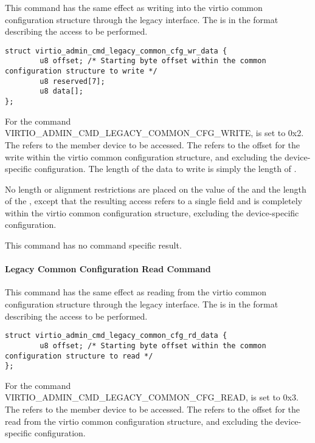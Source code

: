 This command has the same effect as writing into the virtio common configuration
structure through the legacy interface. The  is in
the format  describing
the access to be performed.

\begin{lstlisting}
struct virtio_admin_cmd_legacy_common_cfg_wr_data {
        u8 offset; /* Starting byte offset within the common configuration structure to write */
        u8 reserved[7];
        u8 data[];
};
\end{lstlisting}

For the command VIRTIO_ADMIN_CMD_LEGACY_COMMON_CFG_WRITE, 
is set to 0x2.
The  refers to the member device to be accessed.
The  refers to the offset for the write within the virtio common
configuration structure, and excluding the device-specific configuration.
The length of the data to write is simply the length of .

No length or alignment restrictions are placed on the value of the
 and the length of the , except that the resulting
access refers to a single field and is completely within the virtio common
configuration structure, excluding the device-specific configuration.

This command has no command specific result.

\paragraph{Legacy Common Configuration Read Command}\label{par:Basic Facilities of a Virtio Device / Device groups / Group administration commands / Legacy Interface / Legacy Common Configuration Read Command}

This command has the same effect as reading from the virtio common configuration
structure through the legacy interface. The  is in
the format  describing
the access to be performed.

\begin{lstlisting}
struct virtio_admin_cmd_legacy_common_cfg_rd_data {
        u8 offset; /* Starting byte offset within the common configuration structure to read */
};
\end{lstlisting}

For the command VIRTIO_ADMIN_CMD_LEGACY_COMMON_CFG_READ, 
is set to 0x3.
The  refers to the member device to be accessed.
The  refers to the offset for the read from the virtio common
configuration structure, and excluding the device-specific configuration.

